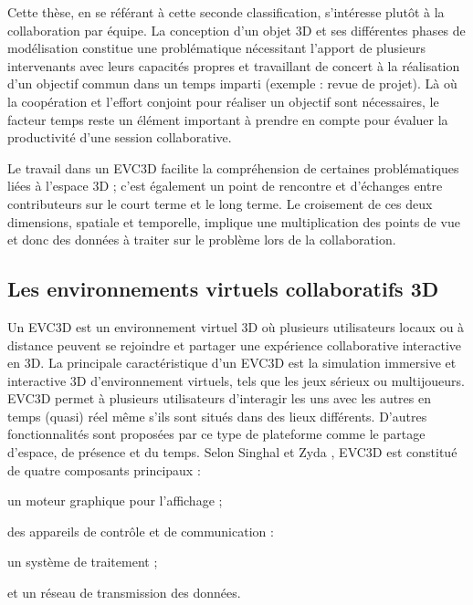 Cette thèse, en se référant à cette seconde classification, s'intéresse plutôt 
à la collaboration par équipe. La conception d'un objet 3D et ses différentes 
phases de modélisation constitue une problématique nécessitant l'apport de 
plusieurs intervenants avec leurs capacités propres et travaillant de concert à la 
réalisation d'un objectif commun dans un temps imparti (exemple : revue de 
projet). Là où la coopération et l'effort conjoint pour réaliser un objectif sont 
nécessaires, le facteur temps reste un élément important à prendre en compte 
pour évaluer la productivité d'une session collaborative.

Le travail dans un \gls{EVC3D} facilite la compréhension 
de certaines problématiques liées à l'espace 3D ; c'est également un point de 
rencontre et d'échanges entre contributeurs sur le court terme et le long terme. 
Le croisement de ces deux dimensions, spatiale et temporelle, implique une 
multiplication des points de vue et donc des données à traiter sur le problème lors 
de la collaboration.

 
\subsection{Les environnements virtuels collaboratifs 3D}

Un \gls{EVC3D} est un environnement virtuel 3D où plusieurs utilisateurs locaux 
ou à distance peuvent se rejoindre et partager une expérience collaborative 
interactive en 3D. La principale caractéristique d'un \gls{EVC3D} est la simulation 
immersive et interactive 3D d'environnement virtuels, tels que les jeux sérieux ou 
multijoueurs. \gls{EVC3D} permet à plusieurs utilisateurs d'interagir les uns avec 
les autres en temps (quasi) réel même s'ils sont situés dans des lieux différents. 
D'autres fonctionnalités sont proposées par ce type de plateforme comme le 
partage d'espace, de présence et du temps. Selon Singhal et Zyda 
\cite{Singhal1999}, \gls{EVC3D} est constitué de quatre composants principaux :
\begin{enumerate*}[label=(\roman*)]
	\item un moteur graphique pour l'affichage ;
	\item des appareils de contrôle et de communication :
	\item un système de traitement ;
	\item et un réseau de transmission des données. 
\end{enumerate*}

